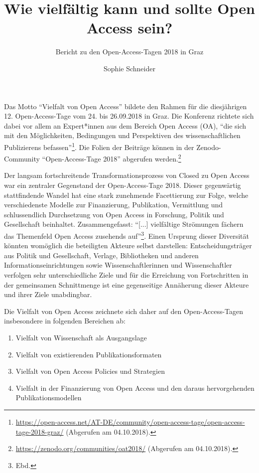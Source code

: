 \documentclass[a4paper,
fontsize=11pt,
oneside,
numbers=noperiodatend,
parskip=half-,
bibliography=totoc,
final
]{scrartcl}
\title{\LARGE{Wie vielfältig kann und sollte Open Access sein?}}%
\subtitle{Bericht zu den Open-Access-Tagen 2018 in Graz}
\author{Sophie Schneider} %
\date{}
\begin{document}
\maketitle
\thispagestyle{fancyplain} 


Das Motto \enquote{Vielfalt von Open Access} bildete den Rahmen für die
diesjährigen 12. Open-Access-Tage vom 24. bis 26.09.2018 in Graz. Die
Konferenz richtete sich dabei vor allem an Expert*innen aus dem Bereich
Open Access (OA), \enquote{die sich mit den Möglichkeiten, Bedingungen
und Perspektiven des wissenschaftlichen Publizierens befassen}\footnote{\url{https://open-access.net/AT-DE/community/open-access-tage/open-access-tage-2018-graz/}
  (Abgerufen am 04.10.2018).}. Die Folien der Beiträge können in der
Zenodo-Community \enquote{Open-Access-Tage 2018} abgerufen
werden.\footnote{\url{https://zenodo.org/communities/oat2018/}
  (Abgerufen am 04.10.2018).}

Der langsam fortschreitende Transformationsprozess von Closed zu Open
Access war ein zentraler Gegenstand der Open-Access-Tage 2018. Dieser
gegenwärtig stattfindende Wandel hat eine stark zunehmende Facettierung
zur Folge, welche verschiedenste Modelle zur Finanzierung, Publikation,
Vermittlung und schlussendlich Durchsetzung von Open Access in
Forschung, Politik und Gesellschaft beinhaltet. Zusammengefasst:
\enquote{{[}...{]} vielfältige Strömungen fächern das Themenfeld Open
Access zusehends auf}\footnote{Ebd.}. Einen Ursprung dieser Diversität
könnten womöglich die beteiligten Akteure selbst darstellen:
Entscheidungsträger aus Politik und Gesellschaft, Verlage, Bibliotheken
und anderen Informationseinrichtungen sowie Wissenschaftlerinnen und
Wissenschaftler verfolgen sehr unterschiedliche Ziele und für die
Erreichung von Fortschritten in der gemeinsamen Schnittmenge ist eine
gegenseitige Annäherung dieser Akteure und ihrer Ziele unabdingbar.

Die Vielfalt von Open Access zeichnete sich daher auf den
Open-Access-Tagen insbesondere in folgenden Bereichen ab:

\begin{enumerate}
\def\labelenumi{\arabic{enumi}.}
\item
  Vielfalt von Wissenschaft als Ausgangslage
\item
  Vielfalt von existierenden Publikationsformaten
\item
  Vielfalt von Open Access Policies und Strategien
\item
  Vielfalt in der Finanzierung von Open Access und den daraus
  hervorgehenden Publikationsmodellen
\end{enumerate}
\end{document}
